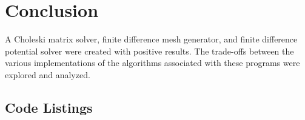 \documentclass[a4paper,titlepage]{article}
\begin{document}
	\section*{Conclusion}
	
	A Choleski matrix solver, finite difference mesh generator, and finite difference potential solver were created with positive results. The trade-offs between the various implementations of the algorithms associated with these programs were explored and analyzed.
	
	\onecolumn
	
	
	\begin{appendices}
		
		\section{Code Listings} \label{appendix:code}
		
		
		\begin{center}
			\inputminted{python}{../matrices.py}
			\label{lst:matrices}
		\end{center}
		
		\begin{center}
			\inputminted{python}{../csv_saver.py}
			\label{lst:csv_saver}
		\end{center}
		
		\begin{center}
			\inputminted{python}{../choleski.py}
			\label{lst:choleski}
		\end{center}
		
		\begin{center}
			\inputminted{python}{../linear_networks.py}
			\label{lst:linear_networks}
		\end{center}
		
		\begin{center}
			\inputminted{python}{../q1.py}
			\label{lst:q1}
		\end{center}
		
		\begin{center}
			\inputminted{python}{../q2.py}
			\label{lst:q2}
		\end{center}
		

\end{appendices}
\end{document}
